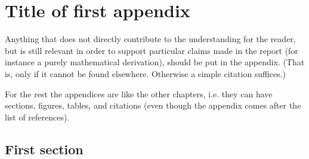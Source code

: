 \chapter{Title of first appendix}
\label{app:appendix_A}

Anything that does not directly contribute to the understanding for the reader, but is still relevant in order to support particular claims made in the report (for instance a purely mathematical derivation), should be put in the appendix. (That is, only if it cannot be found elsewhere. Otherwise a simple citation suffices.)

For the rest the appendices are like the other chapters, i.e. they can have sections, figures, tables, and citations (even though the appendix comes after the list of references).

\section{First section}
\label{sec:title}
